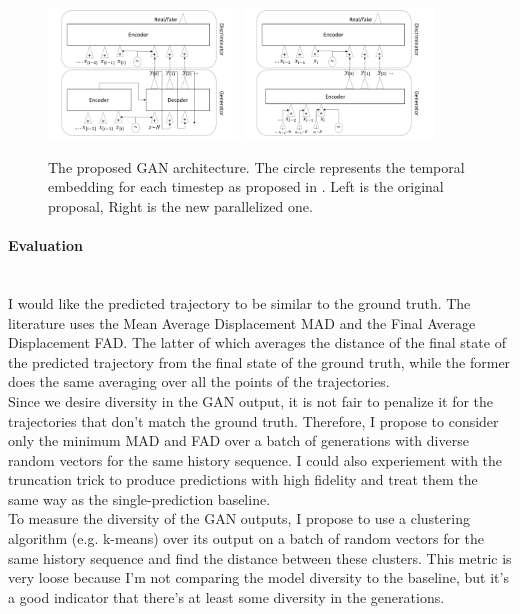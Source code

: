 \documentclass{article}
\begin{document}
\begin{figure}
    \centering
    \includegraphics[width=0.45\textwidth]{gen-disc-figure.pdf}
    \includegraphics[width=0.45\textwidth]{gen-disc-parallel-figure.pdf}\\
    \caption{The proposed GAN architecture.  The circle represents the temporal embedding for each timestep as proposed in \cite{giuliari2020transformer}.  Left is the original proposal, Right is the new parallelized one.}
    \label{gen_disc_figure}
\end{figure}

\paragraph{Evaluation}$ $
\\I would like the predicted trajectory to be similar to the ground truth. The literature \cite{giuliari2020transformer} uses the Mean Average Displacement MAD and the Final Average Displacement FAD. The latter of which averages the distance of the final state of the predicted trajectory from the final state of the ground truth, while the former does the same averaging over all the points of the trajectories. 
\\Since we desire diversity in the GAN output, it is not fair to penalize it for the trajectories that don't match the ground truth. Therefore, I propose to consider only the minimum MAD and FAD over a batch of generations with diverse random vectors for the same history sequence. I could also experiement with the truncation trick to produce predictions with high fidelity and treat them the same way as the single-prediction baseline.  
\\To measure the diversity of the GAN outputs, I propose to use a clustering algorithm (e.g. k-means) over its output on a batch of random vectors for the same history sequence and find the distance between these clusters.  This metric is very loose because I'm not comparing the model diversity to the baseline, but it's a good indicator that there's at least some diversity in the generations. 
\end{document}

